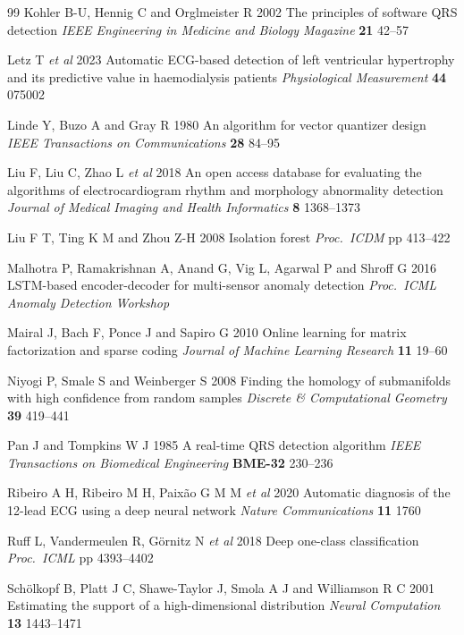 \documentclass{iopjournal}
\begin{document}
\begin{thebibliography}{99}
 Kohler B-U, Hennig C and Orglmeister R 2002 The principles of software QRS detection \emph{IEEE Engineering in Medicine and Biology Magazine} \textbf{21} 42--57

 Letz T \emph{et al} 2023 Automatic ECG-based detection of left ventricular hypertrophy and its predictive value in haemodialysis patients \emph{Physiological Measurement} \textbf{44} 075002

 Linde Y, Buzo A and Gray R 1980 An algorithm for vector quantizer design \emph{IEEE Transactions on Communications} \textbf{28} 84--95

 Liu F, Liu C, Zhao L \emph{et al} 2018 An open access database for evaluating the algorithms of electrocardiogram rhythm and morphology abnormality detection \emph{Journal of Medical Imaging and Health Informatics} \textbf{8} 1368--1373

 Liu F T, Ting K M and Zhou Z-H 2008 Isolation forest \emph{Proc.\ ICDM} pp 413--422

 Malhotra P, Ramakrishnan A, Anand G, Vig L, Agarwal P and Shroff G 2016 LSTM-based encoder-decoder for multi-sensor anomaly detection \emph{Proc.\ ICML Anomaly Detection Workshop}

 Mairal J, Bach F, Ponce J and Sapiro G 2010 Online learning for matrix factorization and sparse coding \emph{Journal of Machine Learning Research} \textbf{11} 19--60

 Niyogi P, Smale S and Weinberger S 2008 Finding the homology of submanifolds with high confidence from random samples \emph{Discrete \& Computational Geometry} \textbf{39} 419--441

 Pan J and Tompkins W J 1985 A real-time QRS detection algorithm \emph{IEEE Transactions on Biomedical Engineering} \textbf{BME-32} 230--236

 Ribeiro A H, Ribeiro M H, Paix\~ao G M M \emph{et al} 2020 Automatic diagnosis of the 12-lead ECG using a deep neural network \emph{Nature Communications} \textbf{11} 1760

 Ruff L, Vandermeulen R, G\"ornitz N \emph{et al} 2018 Deep one-class classification \emph{Proc.\ ICML} pp 4393--4402

 Sch\"olkopf B, Platt J C, Shawe-Taylor J, Smola A J and Williamson R C 2001 Estimating the support of a high-dimensional distribution \emph{Neural Computation} \textbf{13} 1443--1471


\end{thebibliography}
\end{document}
